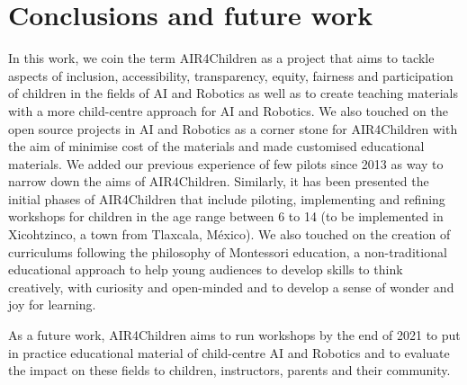 \documentclass[sigconf]{acmart}
\begin{document}


\section{Conclusions and future work}
In this work, we coin the term AIR4Children as a project that aims to tackle aspects of inclusion, accessibility, transparency, equity, fairness and participation of children in the fields of AI and Robotics as well as to create teaching materials with a more child-centre approach for AI and Robotics.
We also touched on the open source projects in AI and Robotics as a corner stone for AIR4Children with the aim of minimise cost of the materials and made customised educational materials.  
We added our previous experience of few pilots since 2013 as way to narrow down the aims of AIR4Children.
Similarly, it has been presented the initial phases of AIR4Children that include piloting, implementing and refining workshops for children in the age range between 6 to 14 (to be implemented in Xicohtzinco, a town from Tlaxcala, M\'exico).
We also touched on the creation of curriculums following the philosophy of Montessori education, a non-traditional educational approach to help young audiences to develop skills to think creatively, with curiosity and open-minded and to develop a sense of wonder and joy for learning.

As a future work, AIR4Children aims to run workshops by the end of 2021 to put in practice educational material of child-centre AI and Robotics and to evaluate the impact on these fields to children, instructors, parents and their community. 
\end{document}
